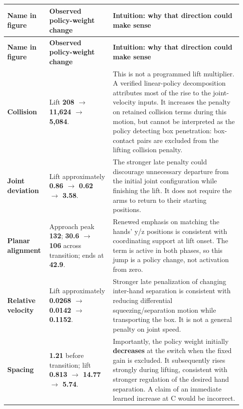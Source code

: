 \documentclass[11pt,a4paper]{article}
\begin{document}
\begingroup\small\setlength{\tabcolsep}{4pt}\renewcommand{\arraystretch}{1.2}
\begin{longtable}{@{}p{0.17\linewidth}p{0.26\linewidth}p{0.53\linewidth}@{}}
\toprule
\textbf{Name in figure} & \textbf{Observed policy-weight change} & \textbf{Intuition: why that direction could make sense} \\
\midrule
\endfirsthead
\toprule
\textbf{Name in figure} & \textbf{Observed policy-weight change} & \textbf{Intuition: why that direction could make sense} \\
\midrule
\endhead
\bottomrule
\endfoot
\textbf{Collision} & Lift \textbf{208 \(\rightarrow\) 11,624 \(\rightarrow\) 5,084}. & This is not a programmed lift multiplier. A verified linear-policy decomposition attributes most of the rise to the joint-velocity inputs. It increases the penalty on retained collision terms during this motion, but cannot be interpreted as the policy detecting box penetration: box-contact pairs are excluded from the lifting collision penalty. \\
\textbf{Joint deviation} & Lift approximately \textbf{0.86 \(\rightarrow\) 0.62 \(\rightarrow\) 3.58}. & The stronger late penalty could discourage unnecessary departure from the initial joint configuration while finishing the lift. It does not require the arms to return to their starting positions. \\
\textbf{Planar alignment} & Approach peak \textbf{132}; \textbf{30.6 \(\rightarrow\) 106} across transition; ends at \textbf{42.9}. & Renewed emphasis on matching the hands' y/z positions is consistent with coordinating support at lift onset. The term is active in both phases, so this jump is a policy change, not activation from zero. \\
\textbf{Relative velocity} & Lift approximately \textbf{0.0268 \(\rightarrow\) 0.0142 \(\rightarrow\) 0.1152}. & Stronger late penalization of changing inter-hand separation is consistent with reducing differential squeezing/separation motion while transporting the box. It is not a general penalty on joint speed. \\
\textbf{Spacing} & \textbf{1.21} before transition; lift \textbf{0.813 \(\rightarrow\) 14.77 \(\rightarrow\) 5.74}. & Importantly, the policy weight initially \textbf{decreases} at the switch when the fixed gain is excluded. It subsequently rises strongly during lifting, consistent with stronger regulation of the desired hand separation. A claim of an immediate learned increase at C would be incorrect. \\

\end{longtable}
\end{document}
